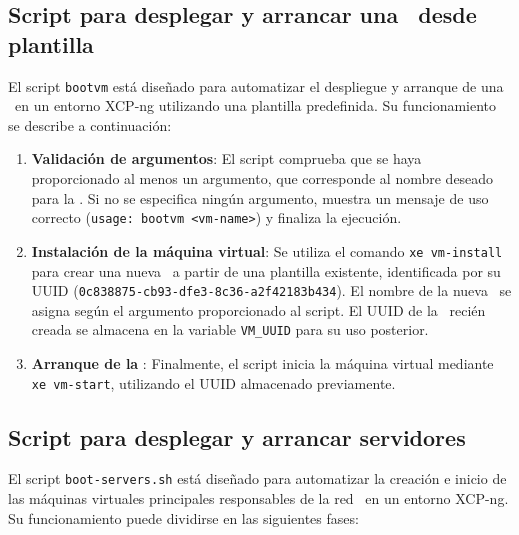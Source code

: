 

\subsection{Script para desplegar y arrancar una \VM\ desde plantilla}
\noindent
El script \texttt{bootvm} está diseñado para automatizar el despliegue y arranque de una \VM\ en un entorno XCP-ng utilizando una plantilla predefinida. Su funcionamiento se describe a continuación:

\begin{enumerate}
    \item \textbf{Validación de argumentos}:  
    El script comprueba que se haya proporcionado al menos un argumento, que corresponde al nombre deseado para la \VM. Si no se especifica ningún argumento, muestra un mensaje de uso correcto (\texttt{usage: bootvm <vm-name>}) y finaliza la ejecución.

    \item \textbf{Instalación de la máquina virtual}:  
    Se utiliza el comando \texttt{xe vm-install} para crear una nueva \VM\ a partir de una plantilla existente, identificada por su UUID (\texttt{0c838875-cb93-dfe3-8c36-a2f42183b434}). El nombre de la nueva \VM\ se asigna según el argumento proporcionado al script. El UUID de la \VM\ recién creada se almacena en la variable \texttt{VM\_UUID} para su uso posterior.

    \item \textbf{Arranque de la \VM}:  
    Finalmente, el script inicia la máquina virtual mediante \texttt{xe vm-start}, utilizando el UUID almacenado previamente.

\end{enumerate}



\subsection{Script para desplegar y arrancar servidores \NAT}
\noindent
El script \texttt{boot-servers.sh} está diseñado para automatizar la creación e inicio de las máquinas virtuales principales responsables de la red \NAT\ en un entorno XCP-ng. Su funcionamiento puede dividirse en las siguientes fases:


